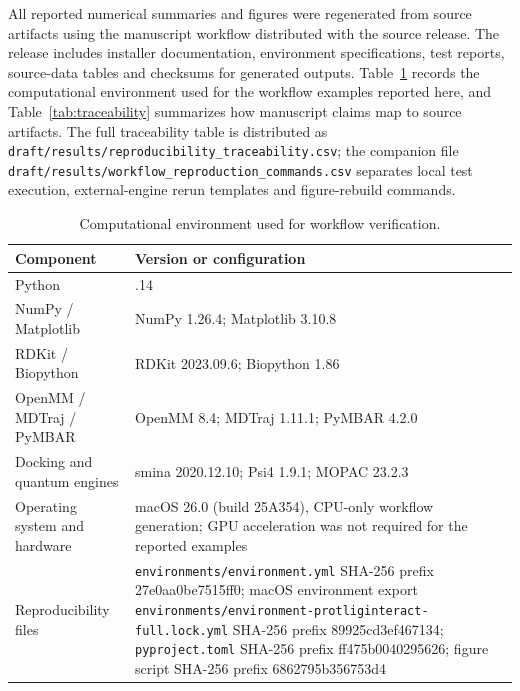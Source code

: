 \documentclass[pdflatex,sn-vancouver-num]{sn-jnl}
\begin{document}
All reported numerical summaries and figures were regenerated from source artifacts using the manuscript workflow distributed with the source release.  The release includes installer documentation, environment specifications, test reports, source-data tables and checksums for generated outputs.  Table~\ref{tab:environment} records the computational environment used for the workflow examples reported here, and Table~\ref{tab:traceability} summarizes how manuscript claims map to source artifacts.  The full traceability table is distributed as \texttt{draft/results/reproducibility\_traceability.csv}; the companion file \texttt{draft/results/workflow\_reproduction\_commands.csv} separates local test execution, external-engine rerun templates and figure-rebuild commands.

\begin{table}[htbp]
\caption{Computational environment used for workflow verification.}\label{tab:environment}
\small
\begin{tabularx}{\textwidth}{>{\raggedright\arraybackslash}p{}>{\raggedright\arraybackslash}X}
\toprule
Component & Version or configuration \\
\midrule
Python & 3.11.14 \\
NumPy / Matplotlib & NumPy 1.26.4; Matplotlib 3.10.8 \\
RDKit / Biopython & RDKit 2023.09.6; Biopython 1.86 \\
OpenMM / MDTraj / PyMBAR & OpenMM 8.4; MDTraj 1.11.1; PyMBAR 4.2.0 \\
Docking and quantum engines & smina 2020.12.10; Psi4 1.9.1; MOPAC 23.2.3 \\
Operating system and hardware & macOS 26.0 (build 25A354), CPU-only workflow generation; GPU acceleration was not required for the reported examples \\
Reproducibility files & \texttt{environments/environment.yml} SHA-256 prefix 27e0aa0be7515ff0; macOS environment export \texttt{environments/environment-protliginteract-full.lock.yml} SHA-256 prefix 89925cd3ef467134; \texttt{pyproject.toml} SHA-256 prefix ff475b0040295626; figure script SHA-256 prefix 6862795b356753d4 \\
\bottomrule
\end{tabularx}
\end{table}
\end{document}
